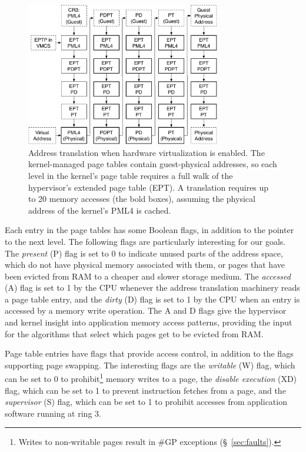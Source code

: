 \begin{figure}[hbt]
  \centering
  \includegraphics[width=85mm]{figures/vmx_paging.pdf}
  \caption{
    Address translation when hardware virtualization is enabled. The
    kernel-managed page tables contain guest-physical addresses, so each level
    in the kernel's page table requires a full walk of the hypervisor's
    extended page table (EPT).  A translation requires up to 20 memory accesses
    (the bold boxes), assuming the physical address of the kernel's PML4 is
    cached.
  }
  \label{fig:vmx_paging}
\end{figure}

Each entry in the page tables has some Boolean flags, in addition to the
pointer to the next level. The following flags are particularly interesting for
our goals. The \textit{present} (P) flag is set to 0 to indicate unused parts
of the address space, which do not have physical memory associated with them,
or pages that have been evicted from RAM to a cheaper and slower storage
medium.  The \textit{accessed} (A) flag is set to 1 by the CPU whenever the
address translation machinery reads a page table entry, and the \textit{dirty}
(D) flag is set to 1 by the CPU when an entry is accessed by a memory write
operation. The A and D flags give the hypervisor and kernel insight into
application memory access patterns, providing the input for the algorithms that
select which pages get to be evicted from RAM.


Page table entries have flags that provide access control, in addition to the
flags supporting page swapping. The interesting flags are the \textit{writable}
(W) flag, which can be set to 0 to prohibit\footnote{Writes to non-writable
pages result in \#GP exceptions (\S~\ref{sec:faults}).} memory writes to a
page, the \textit{disable execution} (XD) flag, which can be set to 1 to
prevent instruction fetches from a page, and the \textit{supervisor} (S) flag,
which can be set to 1 to prohibit accesses from application software running at
ring 3.
